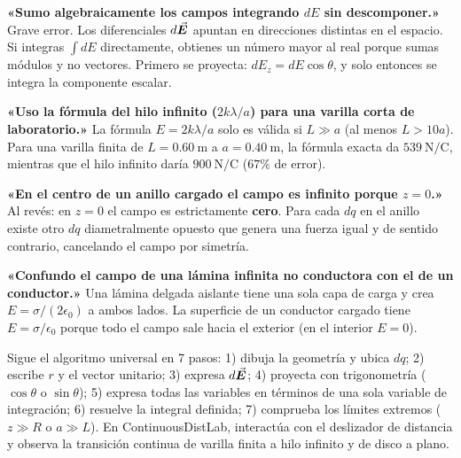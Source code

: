 \documentclass[11pt]{article}
\begin{document}
\begin{eError}\textbf{«Sumo algebraicamente los campos integrando $dE$ sin descomponer.»} Grave error. Los diferenciales $d\vec{\bm{E}}$ apuntan en direcciones distintas en el espacio. Si integras $\int dE$ directamente, obtienes un número mayor al real porque sumas módulos y no vectores. Primero se proyecta: $dE_z = dE\cos\theta$, y solo entonces se integra la componente escalar.\end{eError}
\begin{eError}\textbf{«Uso la fórmula del hilo infinito ($2k\lambda/a$) para una varilla corta de laboratorio.»} La fórmula $E=2k\lambda/a$ solo es válida si $L\gg a$ (al menos $L>10a$). Para una varilla finita de $L=\SI{0,60}{\metre}$ a $a=\SI{0,40}{\metre}$, la fórmula exacta da $\SI{539}{\newton\per\coulomb}$, mientras que el hilo infinito daría $\SI{900}{\newton\per\coulomb}$ ($67\%$ de error).\end{eError}
\begin{eError}\textbf{«En el centro de un anillo cargado el campo es infinito porque $z=0$.»} Al revés: en $z=0$ el campo es estrictamente \textbf{cero}. Para cada $dq$ en el anillo existe otro $dq$ diametralmente opuesto que genera una fuerza igual y de sentido contrario, cancelando el campo por simetría.\end{eError}
\begin{eError}\textbf{«Confundo el campo de una lámina infinita no conductora con el de un conductor.»} Una lámina delgada aislante tiene una sola capa de carga y crea $E=\sigma/(2\epsilon_0)$ a ambos lados. La superficie de un conductor cargado tiene $E=\sigma/\epsilon_0$ porque todo el campo sale hacia el exterior (en el interior $E=0$).\end{eError}

\begin{eConsejo}Sigue el algoritmo universal en 7 pasos: 1) dibuja la geometría y ubica $dq$; 2) escribe $r$ y el vector unitario; 3) expresa $d\vec{\bm{E}}$; 4) proyecta con trigonometría ($\cos\theta$ o $\sin\theta$); 5) expresa todas las variables en términos de una sola variable de integración; 6) resuelve la integral definida; 7) comprueba los límites extremos ($z\gg R$ o $a\gg L$). En ContinuousDistLab, interactúa con el deslizador de distancia y observa la transición continua de varilla finita a hilo infinito y de disco a plano.\end{eConsejo}
\end{document}
